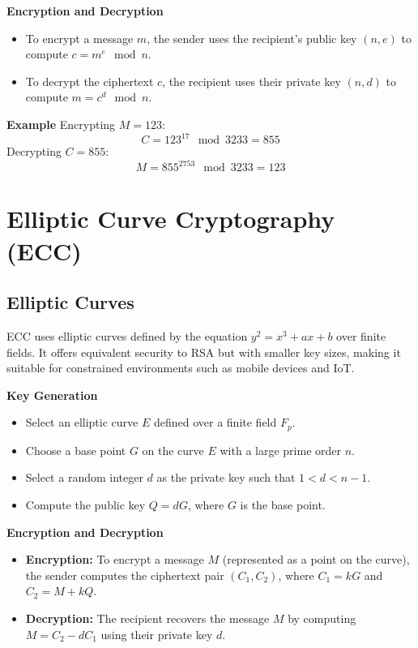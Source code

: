 \documentclass{beamer}
\begin{document}
\begin{frame}

\textbf{Encryption and Decryption}
\begin{itemize}
    \item To encrypt a message \(m\), the sender uses the recipient’s public key \( (n, e) \) to compute \( c = m^e \mod n \).
    \item To decrypt the ciphertext \(c\), the recipient uses their private key \( (n, d) \) to compute \( m = c^d \mod n \).
\end{itemize}
\end{frame}

\begin{frame}
\textbf{Example}
Encrypting \( M = 123 \):
\[
C = 123^{17} \mod 3233 = 855
\]
Decrypting \( C = 855 \):
\[
M = 855^{2753} \mod 3233 = 123
\]

\section{Elliptic Curve Cryptography (ECC)}

\subsection{Elliptic Curves}
ECC uses elliptic curves defined by the equation \( y^2 = x^3 + ax + b \) over finite fields. It offers equivalent security to RSA but with smaller key sizes, making it suitable for constrained environments such as mobile devices and IoT.
\end{frame}

\begin{frame}
\textbf{Key Generation}
\begin{itemize}
    \item Select an elliptic curve \( E \) defined over a finite field \( F_p \).
    \item Choose a base point \( G \) on the curve \( E \) with a large prime order \( n \).
    \item Select a random integer \( d \) as the private key such that \( 1 < d < n - 1 \).
    \item Compute the public key \( Q = dG \), where \( G \) is the base point.
\end{itemize}
\end{frame}

\begin{frame}
\textbf{Encryption and Decryption}
\begin{itemize}
    \item \textbf{Encryption:} To encrypt a message \( M \) (represented as a point on the curve), the sender computes the ciphertext pair \( (C_1, C_2) \), where \( C_1 = kG \) and \( C_2 = M + kQ \).
    \item \textbf{Decryption:} The recipient recovers the message \( M \) by computing \( M = C_2 - dC_1 \) using their private key \( d \).
\end{itemize}
\end{frame}
\end{document}
